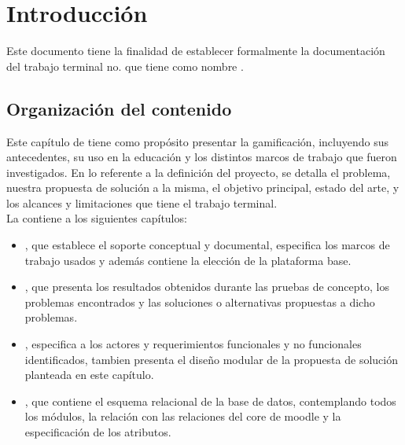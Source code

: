 \chapter{Introducción}
\label{ch:introduccion}

Este documento tiene la finalidad de establecer formalmente la documentación del trabajo terminal no. {\numeroTT} que tiene como nombre {\bf\tituloTT}.

\section{Organización del contenido}

Este capítulo de  tiene como propósito presentar la gamificación, incluyendo sus antecedentes, su uso en la educación y los distintos marcos de trabajo que fueron investigados. En lo referente a la definición del proyecto, se detalla el problema, nuestra propuesta de solución a la misma, el objetivo principal, estado del arte, y los alcances y limitaciones que tiene el trabajo terminal.\\

\noindent La  contiene a los siguientes capítulos:%

    \begin{itemize}
        \item {}, que establece el soporte conceptual y documental, 
        especifica los marcos de trabajo usados y además contiene la elección de la 
        plataforma base.
        
        \item {}, que presenta los resultados obtenidos durante 
        las pruebas de concepto, los problemas encontrados y las soluciones o alternativas 
        propuestas a dicho problemas.
    
        \item {}, especifica a los actores y requerimientos funcionales
        y no funcionales identificados, tambien presenta el diseño modular de la propuesta
        de solución planteada en este capítulo.
        
        \item {}, que contiene el esquema relacional de la base de 
        datos, contemplando todos los módulos, la relación con las relaciones del core de 
        moodle y la especificación de los atributos.
    \end{itemize}

